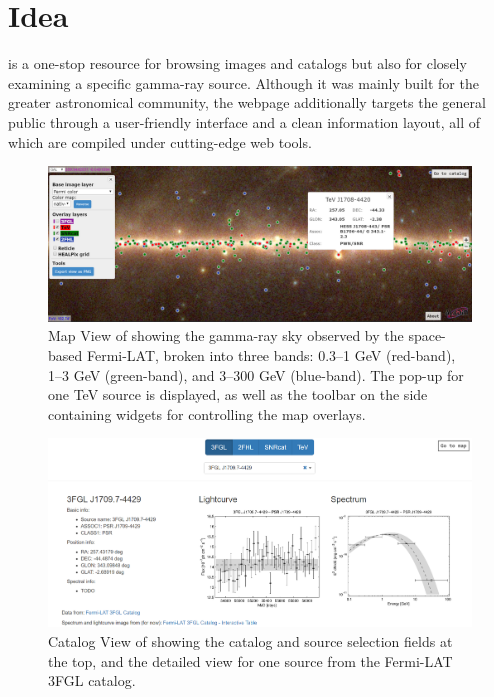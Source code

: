 \section{Idea}

\gammasky is a one-stop resource for browsing images and catalogs but also for closely examining a specific gamma-ray source. Although it was mainly built for the greater astronomical community, the webpage additionally targets the general public through a user-friendly interface and a clean information layout, all of which are compiled under cutting-edge web tools.

\begin{figure}[tb]
\centerline{\includegraphics[width=\textwidth]{figures/mapview_retake}}
\caption{Map View of \gammasky showing the gamma-ray sky observed by the space-based Fermi-LAT, broken into three bands: 0.3--1 GeV (red-band), 1--3 GeV (green-band), and 3--300 GeV (blue-band). The pop-up for one TeV source is displayed, as well as the toolbar on the side containing widgets for controlling the map overlays.}
\label{fig:mapview}
\end{figure}

\begin{figure}[tb]
\centerline{\includegraphics[width=\textwidth]{figures/catview_retake}}
\caption{Catalog View of \gammasky showing the catalog and source selection fields at the top, and the detailed view for one source from the Fermi-LAT 3FGL catalog.}
\label{fig:catview}
\end{figure}

